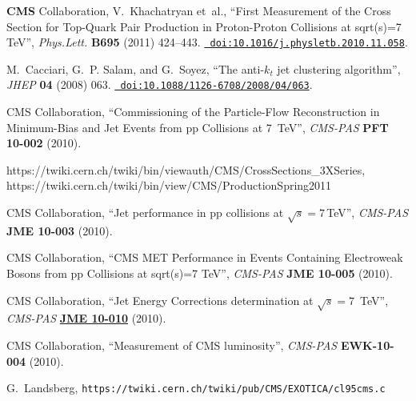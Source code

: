 \begin{thebibliography}{10}
{\bf CMS} Collaboration, V.~Khachatryan {et~al.}, ``{First Measurement of the
  Cross Section for Top-Quark Pair Production in Proton-Proton Collisions at
  sqrt(s)=7 TeV}'', {\em Phys.Lett.} {\bf B695} (2011) 424--443.
  \href{http://dx.doi.org/10.1016/j.physletb.2010.11.058}{{\tt
  doi:10.1016/j.physletb.2010.11.058}}.

M.~Cacciari, G.~P. Salam, and G.~Soyez, ``{The anti-{$k_t$} jet clustering
  algorithm}'', {\em JHEP} {\bf 04} (2008)
063.
  \href{http://dx.doi.org/10.1088/1126-6708/2008/04/063}{{\tt
  doi:10.1088/1126-6708/2008/04/063}}.

{CMS Collaboration}, ``Commissioning of the Particle-Flow Reconstruction in
  Minimum-Bias and Jet Events from pp Collisions at 7~TeV'', {\em CMS-PAS} {\bf
  PFT 10-002} (2010).

 https://twiki.cern.ch/twiki/bin/viewauth/CMS/CrossSections\_3XSeries, 
https://twiki.cern.ch/twiki/bin/view/CMS/ProductionSpring2011

{CMS Collaboration}, ``Jet performance in pp collisions at $\sqrt{s} =
  7$\,TeV'', {\em CMS-PAS} {\bf JME 10-003} (2010).

{CMS Collaboration}, ``CMS MET Performance in Events Containing Electroweak
  Bosons from pp Collisions at sqrt(s)=7 TeV'', {\em CMS-PAS} {\bf JME 10-005}
  (2010).







{CMS Collaboration}, ``Jet Energy Corrections determination at
  {$\sqrt{s}=7$}~TeV'', {\em CMS-PAS} {\bf
  \href{http://cdsweb.cern.ch/record/1308178}{JME 10-010}} (2010).

{CMS Collaboration}, ``Measurement of CMS luminosity'', {\em CMS-PAS} {\bf
  EWK-10-004} (2010).

 G.~Landsberg, {\tt https://twiki.cern.ch/twiki/pub/CMS/EXOTICA/cl95cms.c}

\end{thebibliography}\endgroup
